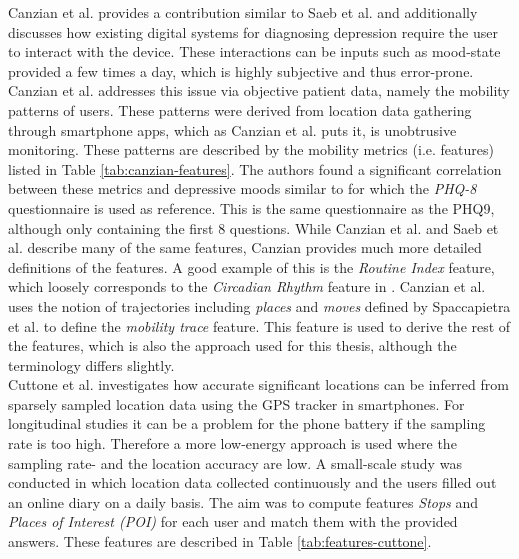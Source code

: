 Canzian et al. provides a contribution similar to Saeb et al. and additionally discusses how existing digital systems for diagnosing depression require the user to interact with the device. These interactions can be inputs such as mood-state provided a few times a day, which is highly subjective and thus error-prone. Canzian et al. addresses this issue via objective patient data, namely the mobility patterns of users. These patterns were derived from location data gathering through smartphone apps, which as Canzian et al. puts it, is unobtrusive monitoring. These patterns are described by the mobility metrics (i.e. features) listed in Table \ref{tab:canzian-features}. The authors found a significant correlation between these metrics and depressive moods similar to \cite{Saeb2015} for which the \textit{PHQ-8} questionnaire is used as  reference. This is the same questionnaire as the PHQ9, although only containing the first 8 questions. While Canzian et al. and Saeb et al. describe many of the same features, Canzian provides much more detailed definitions of the features. A good example of this is the \textit{Routine Index} feature, which loosely corresponds to the \textit{Circadian Rhythm} feature in \cite{Saeb2015}. Canzian et al. \cite{Canzian2015} uses the notion of trajectories including \textit{places} and \textit{moves} defined by Spaccapietra et al. \cite{trajectories2008} to define the \textit{mobility trace} feature. This feature is used to derive the rest of the features, which is also the approach used for this thesis, although the terminology differs slightly.\\

Cuttone et al. \cite{sparse-location-2014} investigates how accurate significant locations can be inferred from sparsely sampled location data using the GPS tracker in smartphones. For longitudinal studies it can be a problem for the phone battery if the sampling rate is too high. Therefore a more low-energy approach is used where the sampling rate- and the location accuracy are low. A small-scale study was conducted in which location data collected continuously and the users filled out an online diary on a daily basis. The aim was to compute features \textit{Stops} and \textit{Places of Interest (POI)} for each user and match them with the provided answers. These features are described in Table \ref{tab:features-cuttone}. \\

